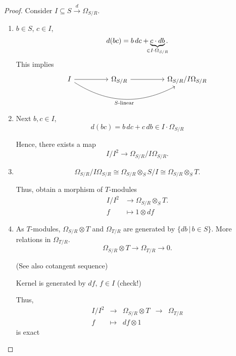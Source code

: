 \documentclass[12pt]{article}
\theoremstyle{definition}
\begin{document}
\begin{proof}
Consider $I\subseteq S\xrightarrow{d}\Omega_{S/R}$.

\begin{enumerate}[label=\alph*)]
\item $b\in S$, $c\in I$,
\[d(bc)=b\,dc+\underbrace{c\cdot db}_{\mathclap{\in I\cdot\Omega_{S/R}}}.\]
This implies
\[
\begin{tikzcd}
I\arrow[rr]\arrow[rrrr,bend right,"S\text{-linear}",swap]&&\Omega_{S/R}\arrow[rr]&&\Omega_{S/R}/I\Omega_{S/R}
\end{tikzcd}
\]

\item Next $b,c\in I$,
\[d(bc)=b\,dc+c\,db\in I\cdot\Omega_{S/R}\]

Hence, there exists a map
\[I/I^2\longrightarrow\Omega_{S/R}/I\Omega_{S/R}.\]

\item
\[\Omega_{S/R}/I\Omega_{S/R}\cong\Omega_{S/R}\otimes_SS/I\cong\Omega_{S/R}\otimes_ST.\]

Thus, obtain a morphism of $T$-modules
\begin{align*}
I/I^2&\longrightarrow\Omega_{S/R}\otimes_ST.\\
f&\longmapsto1\otimes df
\end{align*}

\item As $T$-modules, $\Omega_{S/R}\otimes T$ and $\Omega_{T/R}$ are generated by $\{db\,|\,b\in S\}$. More relations in $\Omega_{T/R}$.
\[\Omega_{S/R}\otimes T\longrightarrow\Omega_{T/R}\longrightarrow0.\]

(See also cotangent sequence)

Kernel is generated by $df$, $f\in I$ (check!)

Thus,
\[
\begin{array}{rclcc}
I/I^2&\longrightarrow&\Omega_{S/R}\otimes T&\longrightarrow&\Omega_{T/R}\\
f&\longmapsto&df\otimes1
\end{array}
\]
is exact
\end{enumerate}
\end{proof}
\end{document}

